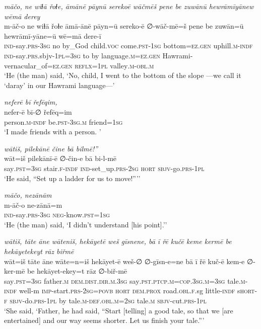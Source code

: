\ea \label{ŽH.23}
\textit{māčo, ne wiɫā řoɫe, āmānē pāynū serekoē wāčmēš pene be zuwānū hewrāmīyānew wēmā derey} \\ 
\gll m-āč-o ne wiɫā řoɫe āmā-ānē pāyn=ū sereko-ē ∅-wāč-mē=š pene be zuwān=ū hewrāmī-yāne=ū wē=mā dere-ī \\ 
 \textsc{ind-}say\textsc{.prs}\textsc{-3sg} no by\_God child.\textsc{voc} come\textsc{.pst}\textsc{-1sg} bottom\textsc{=ez}\textsc{.gen} uphill\textsc{.m}\textsc{-indf} \textsc{ind-}say\textsc{.prs}.sbjv\textsc{-1pl}\textsc{=3sg} to by language\textsc{.m}\textsc{=ez}\textsc{.gen} Hawrami-vernacular\_of\textsc{=ez}\textsc{.gen} \textsc{reflx}\textsc{=1pl} valley\textsc{.m}\textsc{-obl}\textsc{.m} \\ 
\glt `He (the man) said, ‘No, child, I went to the bottom of the slope —we call it ‘daray’ in our Hawrami language—'
\z 
 
\ea \label{ŽH.24}
\textit{neferē bī řefēqim,} \\ 
\gll nefer-ē bī-∅ řefēq=im \\ 
 person\textsc{.m}\textsc{-indf} be\textsc{.pst}\textsc{-3sg}\textsc{.m} friend\textsc{=1sg} \\ 
\glt `I made friends with a person. '
\z 
 
\ea \label{ŽH.25}
\textit{wātiš, pilekānē čine bā bilmē!”} \\ 
\gll wāt=iš pilekānī-ē ∅-čin-e bā bi-l-mē \\ 
 say\textsc{.pst}\textsc{=3sg} stair\textsc{\textsc{.f}}\textsc{-indf} \textsc{ind-}set\_up\textsc{.prs}-\textsc{2sg} \textsc{hort} \textsc{sbjv-}go\textsc{.prs}\textsc{-1pl} \\ 
\glt `He said, “Set up a ladder for us to move!”’'
\z 
 
\ea \label{ŽH.26}
\textit{māčo, nezānām} \\ 
\gll m-āč-o ne-zānā=m \\ 
 \textsc{ind-}say\textsc{.prs}\textsc{-3sg} \textsc{neg-}know\textsc{.pst}\textsc{=1sg} \\ 
\glt `He (the man) said, ‘I didn’t understand [his point].’'
\z 
 
\ea \label{ŽH.27}
\textit{wātiš, tāte āne wāteniš, hekāyetē weš gīsnene, bā ī řē kučē keme kermē be hekāyetekeyt rāz biřmē} \\ 
\gll wāt=iš tāte āne wāte=n=iš hekāyet-ē weš-∅ ∅-gīsn-e=ne bā ī řē kuč-ē kem-e ∅-ker-mē be hekāyet-ekey=t rāz ∅-biř-mē \\ 
 say\textsc{.pst}\textsc{=3sg} father\textsc{.m} \textsc{dem.dist}\textsc{.dir}\textsc{.m}\textsc{.3sg} say\textsc{.pst}\textsc{.ptcp}\textsc{.m}\textsc{=cop}\textsc{.3sg}\textsc{.m}\textsc{=3sg} tale\textsc{.m}\textsc{-indf} well-m \textsc{imp-}start\textsc{.prs}-\textsc{2sg}\textsc{=\textsc{povb}} \textsc{hort} \textsc{dem.prox} road\textsc{.obl}\textsc{\textsc{.f}}.sg little\textsc{-indf} s\textsc{hort}\textsc{-f} \textsc{sbjv-}do\textsc{.prs}\textsc{-1pl} by tale\textsc{.m}\textsc{-def}\textsc{.obl}\textsc{.m}\textsc{=\textsc{2sg}} tale\textsc{.m} \textsc{sbjv-}cut\textsc{.prs}\textsc{-1pl} \\ 
\glt `She said, ‘Father, he had said, “Start [telling] a good tale, so that we [are entertained] and our way seems shorter. Let us finish your tale.”'
\z 
 
